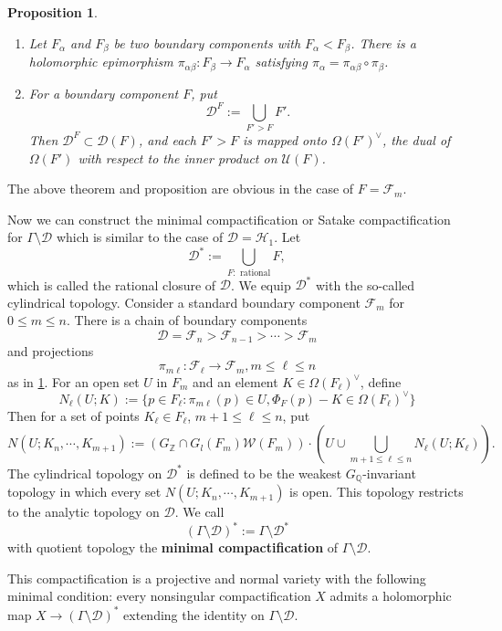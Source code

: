 \documentclass[11pt,english]{smfart}
\newtheorem{proposition}{Proposition}[section]
\theoremstyle{definition}
\theoremstyle{remark}
\newcommand{\Q}{\mathbb{Q}}
\newcommand{\Z}{\mathbb{Z}}
\newcommand{\under}{\!\setminus\!}
\begin{document}
\begin{proposition}\label{projection between b.c.}
    \begin{enumerate}
        \item [(1)] Let $F_\alpha$ and $F_\beta$ be two boundary components with $F_\alpha < F_\beta$.
        There is a holomorphic epimorphism $\pi_{\alpha\beta}: F_\beta\to F_\alpha$ satisfying $\pi_{\alpha} = \pi_{\alpha\beta}\circ\pi_\beta$.
        \item [(2)] For a boundary component $F$, put\[\mathcal{D}^{F} := \bigcup_{F' > F} F'.\]
        Then $\mathcal{D}^F\subset\mathcal{D}(F)$, and each $F' > F$ is mapped onto $\Omega(F')^{\vee}$, the dual of $\Omega(F')$ with respect to the inner product on $\mathcal{U}(F)$.
    \end{enumerate}
\end{proposition}
The above theorem and proposition are obvious in the case of $F = \mathcal{F}_m$.

Now we can construct the minimal compactification or Satake compactification for $\Gamma\under\mathcal{D}$ which is similar to the case of $\mathcal{D} = \mathcal{H}_1$.
Let \[\mathcal{D}^{*} := \bigcup_{F: \text{ rational}} F, \]which is called the rational closure of $\mathcal{D}$.
We equip $\mathcal{D}^{*}$ with the so-called cylindrical topology.
Consider a standard boundary component $\mathcal{F}_{m}$ for $0 \le m \le n$.
There is a chain of boundary components \[\mathcal{D} = \mathcal{F}_{n} > \mathcal{F}_{n-1} > \cdots > \mathcal{F}_{m}\] and projections \[\pi_{m\ell }: \mathcal{F}_\ell\to \mathcal{F}_m, m\le \ell\le n\]as in \cref{projection between b.c.}.
For an open set $U$ in $F_m$ and an element $K\in \Omega(F_\ell)^{\vee}$, define \[N_\ell(U; K) := \{p\in F_\ell: \pi_{m\ell}(p)\in U, \Phi_F(p) - K\in\Omega(F_{\ell})^{\vee}\}\]
Then for a set of points $K_\ell\in F_\ell$, $m+1\le \ell\le n$, put \[N(U; K_n, \cdots, K_{m+1}) := (G_\Z\cap G_l(F_m)\mathcal{W}(F_m))\cdot \left( U\cup\bigcup_{m+1\le \ell\le n} N_{\ell}(U; K_\ell) \right).\]
The cylindrical topology on $\mathcal{D}^*$ is defined to be the weakest $G_\Q$-invariant topology in which every set $N(U; K_n, \cdots, K_{m+1})$ is open.
This topology restricts to the analytic topology on $\mathcal{D}$.
We call \[(\Gamma\under\mathcal{D})^* := \Gamma\under\mathcal{D}^*\] with quotient topology the \textbf{minimal compactification} of $\Gamma\under\mathcal{D}$.

This compactification is a projective and normal variety with the following minimal condition: every nonsingular compactification $X$ admits a holomorphic map $X\to (\Gamma\under\mathcal{D})^*$ extending the identity on $\Gamma\under\mathcal{D}$.
\end{document}
